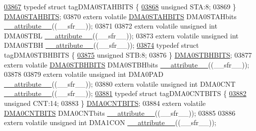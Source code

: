 \begin{DoxyCode}
\hypertarget{a00015_source_l03867}{}\hyperlink{a00014}{03867} \textcolor{keyword}{typedef} \textcolor{keyword}{struct }tagDMA0STAHBITS \{
\hypertarget{a00015_source_l03868}{}\hyperlink{a00014_a0eec78ddd2c12af678d5fab70fe62d14}{03868}   \textcolor{keywordtype}{unsigned} STA:8;
03869 \} \hyperlink{a00014_d0/da0/a00403}{DMA0STAHBITS};
03870 \textcolor{keyword}{extern} \textcolor{keyword}{volatile} \hyperlink{a00014_d0/da0/a00403}{DMA0STAHBITS} DMA0STAHbits \hyperlink{a00015_a493c46f03454991ccc5aa7a6e1dfb2a7}{\_\_attribute\_\_}((\_\_sfr\_\_));
03871 
03872 \textcolor{keyword}{extern} \textcolor{keyword}{volatile} \textcolor{keywordtype}{unsigned} \textcolor{keywordtype}{int}  DMA0STBL \hyperlink{a00015_a493c46f03454991ccc5aa7a6e1dfb2a7}{\_\_attribute\_\_}((\_\_sfr\_\_));
03873 \textcolor{keyword}{extern} \textcolor{keyword}{volatile} \textcolor{keywordtype}{unsigned} \textcolor{keywordtype}{int}  DMA0STBH \hyperlink{a00015_a493c46f03454991ccc5aa7a6e1dfb2a7}{\_\_attribute\_\_}((\_\_sfr\_\_));
\hypertarget{a00015_source_l03874}{}\hyperlink{a00014}{03874} \textcolor{keyword}{typedef} \textcolor{keyword}{struct }tagDMA0STBHBITS \{
\hypertarget{a00015_source_l03875}{}\hyperlink{a00014_a9bd043a4db27e09b5035a563a8758fe7}{03875}   \textcolor{keywordtype}{unsigned} STB:8;
03876 \} \hyperlink{a00014_d9/de6/a00404}{DMA0STBHBITS};
03877 \textcolor{keyword}{extern} \textcolor{keyword}{volatile} \hyperlink{a00014_d9/de6/a00404}{DMA0STBHBITS} DMA0STBHbits \hyperlink{a00015_a493c46f03454991ccc5aa7a6e1dfb2a7}{\_\_attribute\_\_}((\_\_sfr\_\_));
03878 
03879 \textcolor{keyword}{extern} \textcolor{keyword}{volatile} \textcolor{keywordtype}{unsigned} \textcolor{keywordtype}{int}  DMA0PAD \hyperlink{a00015_a493c46f03454991ccc5aa7a6e1dfb2a7}{\_\_attribute\_\_}((\_\_sfr\_\_));
03880 \textcolor{keyword}{extern} \textcolor{keyword}{volatile} \textcolor{keywordtype}{unsigned} \textcolor{keywordtype}{int}  DMA0CNT \hyperlink{a00015_a493c46f03454991ccc5aa7a6e1dfb2a7}{\_\_attribute\_\_}((\_\_sfr\_\_));
\hypertarget{a00015_source_l03881}{}\hyperlink{a00014}{03881} \textcolor{keyword}{typedef} \textcolor{keyword}{struct }tagDMA0CNTBITS \{
\hypertarget{a00015_source_l03882}{}\hyperlink{a00014_a30be39d82c244f19fd98dd74227487f6}{03882}   \textcolor{keywordtype}{unsigned} CNT:14;
03883 \} \hyperlink{a00014_d9/da1/a00396}{DMA0CNTBITS};
03884 \textcolor{keyword}{extern} \textcolor{keyword}{volatile} \hyperlink{a00014_d9/da1/a00396}{DMA0CNTBITS} DMA0CNTbits \hyperlink{a00015_a493c46f03454991ccc5aa7a6e1dfb2a7}{\_\_attribute\_\_}((\_\_sfr\_\_));
03885 
03886 \textcolor{keyword}{extern} \textcolor{keyword}{volatile} \textcolor{keywordtype}{unsigned} \textcolor{keywordtype}{int}  DMA1CON \hyperlink{a00015_a493c46f03454991ccc5aa7a6e1dfb2a7}{\_\_attribute\_\_}((\_\_sfr\_\_));

\end{DoxyCode}
